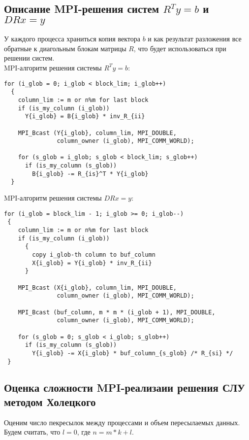 \documentclass[a4paper,12pt]{article}
\begin{document}
\subsection{Описание MPI-решения систем $R^T y = b$ и $DRx = y$}

    У каждого процесса храниться копия вектора $b$ и как результат разложения все 
    обратные к диагольным блокам матрицы $R$, что будет использоваться при решении систем.\\
    
    MPI-алгоритм решения системы $R^T y = b$:
    
\begin{verbatim}
for (i_glob = 0; i_glob < block_lim; i_glob++)
  {
    column_lim := m or n%m for last block
    if (is_my_column (i_glob))
      Y{i_glob} = B{i_glob} * inv_R_{ii}
     
    MPI_Bcast (Y{i_glob}, column_lim, MPI_DOUBLE, 
               column_owner (i_glob), MPI_COMM_WORLD);
              
    for (s_glob = i_glob; s_glob < block_lim; s_glob++)          
      if (is_my_column (s_glob))
        B{i_glob} -= R_{is}^T * Y{i_glob}
  }
\end{verbatim}

    MPI-алгоритм решения системы $DRx = y$:

\begin{verbatim}
for (i_glob = block_lim - 1; i_glob >= 0; i_glob--)
 {
    column_lim := m or n%m for last block
    if (is_my_column (i_glob))
      {
        copy i_glob-th column to buf_column
        X{i_glob} = Y{i_glob} * inv_R_{ii}
      }
     
    MPI_Bcast (X{i_glob}, column_lim, MPI_DOUBLE, 
               column_owner (i_glob), MPI_COMM_WORLD);

    MPI_Bcast (buf_column, m * m * (i_glob + 1), MPI_DOUBLE, 
               column_owner (i_glob), MPI_COMM_WORLD);
              
    for (s_glob = 0; s_glob < i_glob; s_glob++)          
      if (is_my_column (s_glob))
        Y{i_glob} -= X{i_glob} * buf_column_{s_glob} /* R_{si} */
 }
\end{verbatim}
    
    
\newpage
\subsection{Оценка сложности MPI-реализаии решения СЛУ методом Холецкого}

    Оценим число пекресылок между процессами и объем пересылаемых данных.
    Будем считать, что $l = 0$, где $n = m * k + l$.
    
\end{document}

